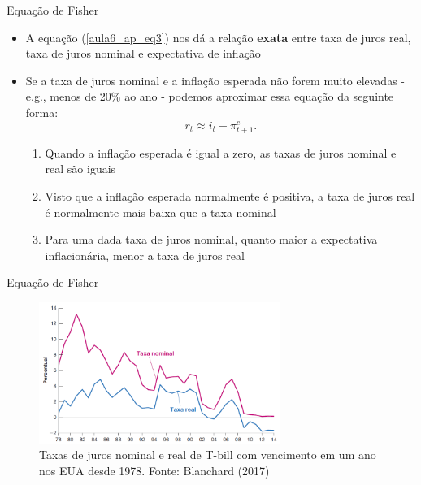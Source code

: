 \documentclass[10pt]{beamer}
\begin{document}
\begin{frame}{Equação de Fisher}
    \begin{itemize}
        \item A equação (\ref{aula6_ap_eq3}) nos dá a relação \textbf{exata} entre taxa de juros real, taxa de juros nominal e expectativa de inflação\bigskip

        \item Se a taxa de juros nominal e a inflação esperada não forem muito elevadas - e.g., menos de 20\% ao ano - podemos aproximar essa equação da seguinte forma:
        \begin{equation}
            r_t \approx i_t - \pi_{t+1}^e.
            \label{aula6_ap_eq4}
        \end{equation}
        
        \begin{enumerate}
            \item Quando a inflação esperada é igual a zero, as taxas de juros nominal e real são iguais\medskip

            \item Visto que a inflação esperada normalmente é positiva, a taxa de juros real é normalmente mais baixa que a taxa nominal\medskip

            \item Para uma dada taxa de juros nominal, quanto maior a expectativa inflacionária, menor a taxa de juros real
        \end{enumerate}
    \end{itemize}
\end{frame}

\begin{frame}{Equação de Fisher}
    \begin{figure}
        \centering
        \includegraphics[width=0.7\textwidth]{./figures/aula6_fig7.PNG}
        \caption{Taxas de juros nominal e real de T-bill com vencimento em um ano nos EUA desde 1978. Fonte: Blanchard (2017)}
        \label{aula6_ap_fig1}
    \end{figure}
\end{frame}
\end{document}
